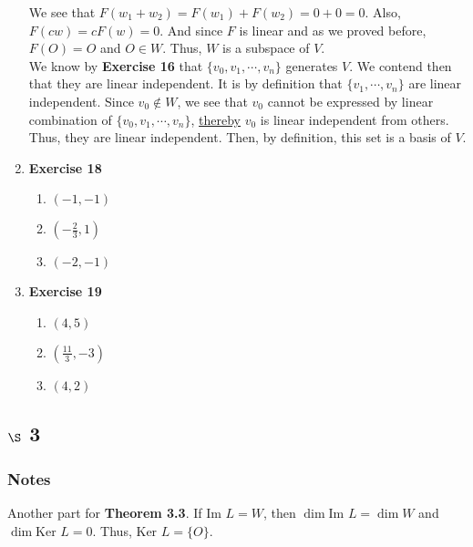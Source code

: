 \documentclass[11pt]{article}
\begin{document}
\begin{enumerate}
We see that \(F(w_1+w_2)=F(w_1)+F(w_2)=0+0=0\). Also, \(F(cw)=cF(w)=0\). And since \(F\) is linear and as we proved before, \(F(O)=O\) and \(O\in W\). Thus, \(W\) is a subspace of \(V\).\\
We know by \textbf{Exercise 16} that \(\{v_0,v_1,\cdots , v_n\}\) generates \(V\). We contend then that they are linear independent. It is by definition that \(\{v_1,\cdots , v_n\}\) are linear independent. Since \(v_0\not \in W\), we see that \(v_0\) cannot be expressed by linear combination of \(\{v_0,v_1,\cdots , v_n\}\), \hyperref[orgb6c34b8]{thereby} \(v_0\) is linear independent from others. Thus, they are linear independent. Then, by definition, this set is a basis of \(V\).
\item \textbf{Exercise 18}
\label{sec:orgdbe3364}
\begin{enumerate}
\item \((-1,-1)\)
\item \((-\frac{2}{3},1)\)
\item \((-2,-1)\)
\end{enumerate}
\item \textbf{Exercise 19}
\label{sec:org621c470}
\begin{enumerate}
\item \((4,5)\)
\item \((\frac{11}{3},-3)\)
\item \((4,2)\)
\end{enumerate}
\end{enumerate}
\subsection{\(\S\) 3}
\label{sec:orgd19351a}
\subsubsection{Notes}
\label{sec:org98003dd}
Another part for \textbf{Theorem 3.3}. If \(\text{Im } L=W\), then \(\dim \text{Im } L=\dim W\) and \(\dim \text{Ker }L=0\). Thus, \(\text{Ker } L=\{O\}\).
\end{document}
